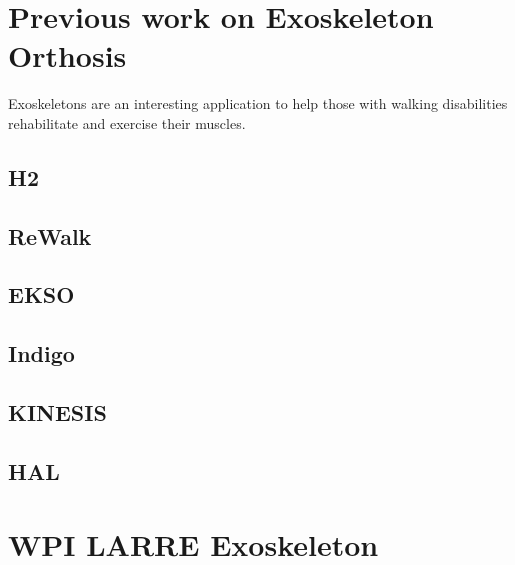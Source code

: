 

\section{Previous work on Exoskeleton Orthosis}
\label{sec:OtherExos}
Exoskeletons are an interesting application to help those with walking disabilities rehabilitate and exercise their muscles.

\subsection{H2}

\subsection{ReWalk}

\subsection{EKSO}

\subsection{Indigo}

\subsection{KINESIS}

\subsection{HAL}

\section{WPI LARRE Exoskeleton}

